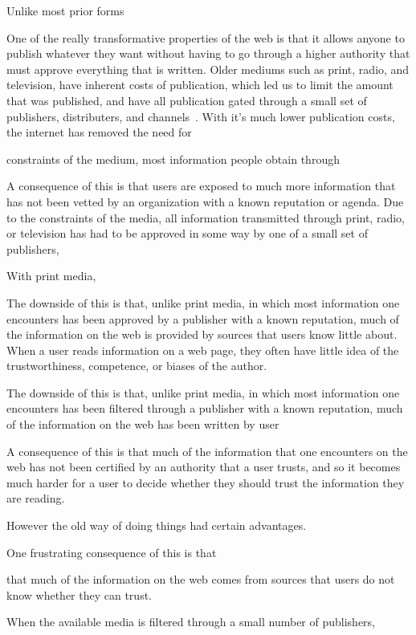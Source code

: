 
Unlike most prior forms 


One of the really transformative properties of the web is that it allows anyone to publish whatever they want without having to go through a higher authority that must approve everything that is written. Older mediums such as print, radio, and television, have inherent costs of publication, which led us to limit the amount that was published, and have all publication gated through a small set of publishers, distributers, and channels~\cite{shirky?}. With it's much lower publication costs, the internet has removed the need for 

constraints of the medium, most information people obtain through 

A consequence of this is that users are exposed to much more information that has not been vetted by an organization with a known reputation or agenda. Due to the constraints of the media, all information transmitted through print, radio, or television has had to be approved in some way by one of a small set of publishers, 

With print media,


The downside of this is that, unlike print media, in which most information one encounters has been approved by a publisher with a known reputation, much of the information on the web is provided by sources that users know little about. When a user reads information on a web page, they often have little idea of the trustworthiness, competence, or biases of the author.


The downside of this is that, unlike print media, in which most information one encounters has been filtered through a publisher with a known reputation, much of the information on the web has been written by user

A consequence of this is that much of the information that one encounters on the web has not been certified by an authority that a user trusts, and so it becomes much harder for a user to decide whether they should trust the information they are reading.


However the old way of doing things had certain advantages. 

One frustrating consequence of this is that 

 that much of the information on the web comes from sources that users do not know whether they can trust. 

When the available media is filtered through a small number of publishers, 

